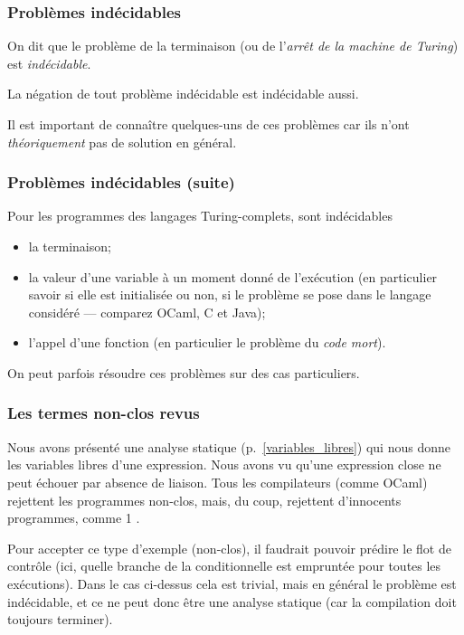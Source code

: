 %
\begin{frame}
\frametitle{Problèmes indécidables}

\label{indecidabilite}

On dit que le problème de la terminaison (ou de l'\emph{arrêt de la
machine de Turing}) est \emph{indécidable}.

\bigskip

La négation de tout problème indécidable est indécidable aussi.

\bigskip

Il est important de connaître quelques-uns de ces problèmes car ils
n'ont \emph{théoriquement} pas de solution en général.

\end{frame}

%
\begin{frame}
\frametitle{Problèmes indécidables (suite)}

Pour les programmes des langages Turing-complets, sont indécidables
\begin{itemize}

  \item la terminaison;

  \item la valeur d'une variable à un moment donné de l'exécution (en
  particulier savoir si elle est initialisée ou non, si le problème se
  pose dans le langage considéré --- comparez OCaml, C et Java);

  \item l'appel d'une fonction (en particulier le problème du
  \emph{code mort}).

\end{itemize}
\remarque \quad On peut parfois résoudre ces problèmes sur des cas
particuliers.

\end{frame}

%
\begin{frame}
\frametitle{Les termes non-clos revus}

Nous avons présenté une analyse statique (p.~\ref{variables_libres})
qui nous donne les variables libres d'une expression. Nous avons vu
qu'une expression close ne peut échouer par absence de liaison. Tous
les compilateurs (comme OCaml) rejettent les programmes non-clos,
mais, du coup, rejettent d'innocents programmes, comme \Xif
\Xtrue \Xthen \num{1} \Xelse {}.

\bigskip

Pour accepter ce type d'exemple (non-clos), il faudrait pouvoir
prédire le flot de contrôle (ici, quelle branche de la conditionnelle
est empruntée pour toutes les exécutions). Dans le cas ci-dessus cela
est trivial, mais en général le problème est indécidable, et ce ne
peut donc être une analyse statique (car la compilation doit toujours
terminer).

\end{frame}

